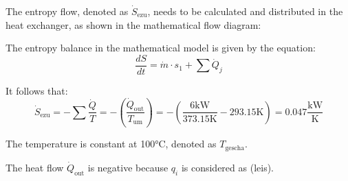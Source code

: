 The entropy flow, denoted as \(\dot{S}_{\text{ezu}}\), needs to be calculated and distributed in the heat exchanger, as shown in the mathematical flow diagram:

The entropy balance in the mathematical model is given by the equation:
\[
\frac{dS}{dt} = \dot{m} \cdot s_1 + \sum \dot{Q}_j
\]

It follows that:
\[
\dot{S}_{\text{ezu}} = -\sum \frac{\dot{Q}}{T} = -\left( \frac{\dot{Q}_{\text{out}}}{T_{\text{um}}} \right) = -\left( \frac{6 \text{kW}}{373.15 \text{K}} - 293.15 \text{K} \right) = 0.047 \frac{\text{kW}}{\text{K}}
\]

The temperature is constant at 100°C, denoted as \(T_{\text{gescha}}\).

The heat flow \(\dot{Q}_{\text{out}}\) is negative because \(q_i\) is considered as (leis).